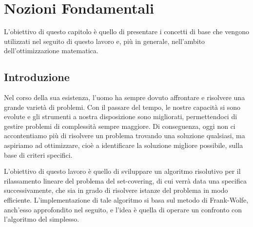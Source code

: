 \chapter{Nozioni Fondamentali}
L'obiettivo di  questo capitolo è quello di presentare i concetti di base che vengono utilizzati nel seguito di questo
lavoro e, più in generale, nell'ambito dell'ottimizzazione matematica.

\section{Introduzione}
Nel corso della sua esistenza, l’uomo ha sempre dovuto affrontare e risolvere una grande varietà di problemi. Con il
passare del tempo, le nostre capacità si sono evolute e gli strumenti a nostra disposizione sono migliorati,
permettendoci di gestire problemi di complessità sempre maggiore. Di conseguenza, oggi non ci accontentiamo più di
risolvere un problema trovando una soluzione qualsiasi, ma aspiriamo ad ottimizzare, cioè a identificare la soluzione
migliore possibile, sulla base di criteri specifici.

L'obiettivo di questo lavoro è quello di sviluppare un algoritmo risolutivo per il rilassamento
lineare del problema del set-covering, di cui verrà data una specifica successivamente, che sia in grado di risolvere
istanze del problema in modo efficiente. L'implementazione di tale algoritmo si basa sul metodo di Frank-Wolfe,
anch'esso approfondito nel seguito, e l'idea è quella di operare un confronto con l'algoritmo del simplesso.
